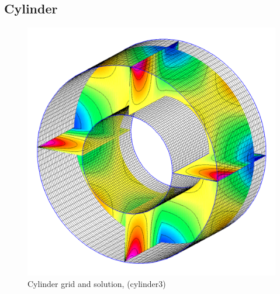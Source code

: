 \clearpage
\subsection{Cylinder}

\begin{figure}[hbt]
\begin{center}
  \includegraphics[width=.75\linewidth]{fig/cylinder3_u}
  \end{center} 
\caption{Cylinder grid and solution, (cylinder3)}
\label{fig:cylinder3}
\end{figure}



